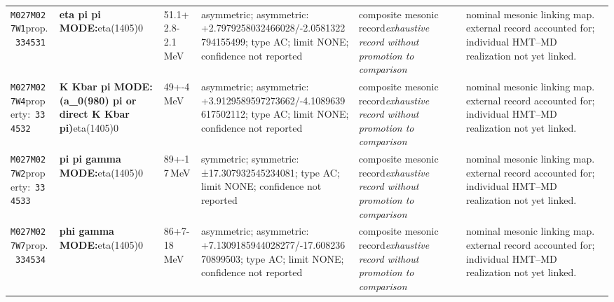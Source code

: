 \begin{landscape}
\begin{longtable}{L{1.85cm}L{4.45cm}L{2.35cm}L{4.05cm}L{3.35cm}L{7.15cm}}
\texttt{M027}\newline \texttt{M027W1}\newline prop.\ \texttt{334531} & \textbf{eta pi pi MODE:}\newline eta(1405)0 & 51.1+2.8-2.1\,MeV & asymmetric; asymmetric: +2.7979258032466028/-2.0581322794155499; type AC; limit NONE; confidence not reported & composite mesonic record\newline \emph{exhaustive record without promotion to comparison} & nominal mesonic linking map. external record accounted for; individual HMT--MD realization not yet linked. \\
\texttt{M027}\newline \texttt{M027W4}\newline property:\ \texttt{334532} & \textbf{K Kbar pi MODE: (a\_\allowbreak{}0(980) pi or direct K Kbar pi)}\newline eta(1405)0 & 49+-4\,MeV & asymmetric; asymmetric: +3.9129589597273662/-4.1089639617502112; type AC; limit NONE; confidence not reported & composite mesonic record\newline \emph{exhaustive record without promotion to comparison} & nominal mesonic linking map. external record accounted for; individual HMT--MD realization not yet linked. \\
\texttt{M027}\newline \texttt{M027W2}\newline property:\ \texttt{334533} & \textbf{pi pi gamma MODE:}\newline eta(1405)0 & 89+-17\,MeV & symmetric; symmetric: ±17.307932545234081; type AC; limit NONE; confidence not reported & composite mesonic record\newline \emph{exhaustive record without promotion to comparison} & nominal mesonic linking map. external record accounted for; individual HMT--MD realization not yet linked. \\
\texttt{M027}\newline \texttt{M027W7}\newline prop.\ \texttt{334534} & \textbf{phi gamma MODE:}\newline eta(1405)0 & 86+7-18\,MeV & asymmetric; asymmetric: +7.1309185944028277/-17.60823670899503; type AC; limit NONE; confidence not reported & composite mesonic record\newline \emph{exhaustive record without promotion to comparison} & nominal mesonic linking map. external record accounted for; individual HMT--MD realization not yet linked. \\

\end{longtable}
\end{landscape}
